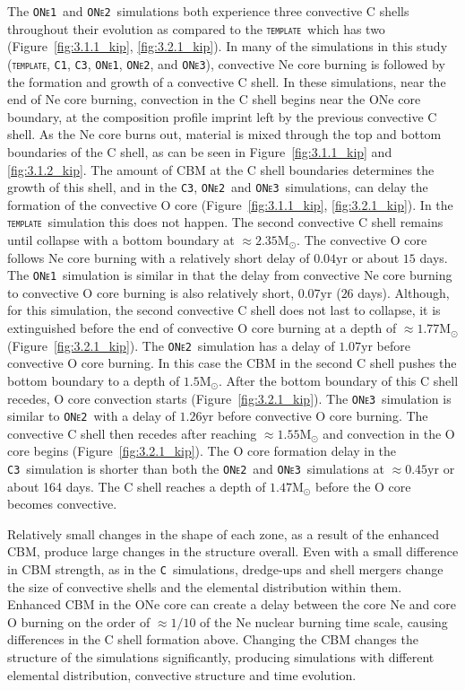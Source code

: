 \documentclass[useAMS,usenatbib]{mn2e}
\newcommand{\Msun}{\ensuremath{\mathrm{M}_\odot}}
\newcommand{\template}{\textsc{\texttt{template}}}
\newcommand{\Ca}{\textsc{\texttt{C1}}}
\newcommand{\Cc}{\textsc{\texttt{C3}}}
\newcommand{\ONea}{\textsc{\texttt{ONe1}}}
\newcommand{\ONeb}{\textsc{\texttt{ONe2}}}
\newcommand{\ONec}{\textsc{\texttt{ONe3}}}
\newcommand{\C}{\textsc{\texttt{C}}}
\begin{document}
The \ONea\ and \ONeb\ simulations both experience three convective C shells
throughout their evolution as compared to the \template\ which has two
(Figure~\ref{fig:3.1.1_kip}, \ref{fig:3.2.1_kip}). In many of the simulations
in this study (\template, \Ca, \Cc, \ONea, \ONeb, and \ONec), convective Ne core burning is followed by the formation and growth of a convective C shell. In these simulations, near the end of Ne core burning, convection in the C shell begins near the ONe core boundary, at the composition profile imprint left by the previous convective C shell. As the Ne core burns out, material is mixed through the top and bottom boundaries of the C shell, as can be seen in Figure~\ref{fig:3.1.1_kip} and \ref{fig:3.1.2_kip}. The amount of CBM at the C shell boundaries determines the growth of this shell, and in the \Cc, \ONeb\ and \ONec\ simulations, can delay the formation of the convective O core (Figure~\ref{fig:3.1.1_kip}, \ref{fig:3.2.1_kip}). In the \template\ simulation
this does not happen. The second convective C shell remains until collapse with
a bottom boundary at $\approx 2.35 \mathrm{M}_{\odot}$. The convective O core
follows Ne core burning with a relatively short delay of $0.04 \mathrm{yr}$ or
about $15$ days. The \ONea\ simulation is similar
in that the delay from convective Ne core burning to convective O core burning
is also relatively short, $0.07 \mathrm{yr}$ ($26$ days). Although, for this
simulation, the second convective C shell does not last to collapse, it is
extinguished before the end of convective O core burning at a depth of $\approx
1.77\Msun$ (Figure~\ref{fig:3.2.1_kip}). The \ONeb\ simulation
has a delay of $1.07 \mathrm{yr}$ before convective O core burning. In this case the CBM in the second C shell pushes
the bottom boundary to a depth of $1.5 \mathrm{M}_{\odot}$. After the bottom
boundary of this C shell recedes, O core convection starts
(Figure~\ref{fig:3.2.1_kip}). The \ONec\ simulation is similar to \ONeb\ with
a delay of $1.26 \mathrm{yr}$ before convective O core burning. The convective
C shell then recedes after reaching $\approx 1.55 \mathrm{M}_{\odot}$ and
convection in the O core begins (Figure~\ref{fig:3.2.1_kip}). The O core formation delay in the \Cc\ simulation is shorter than both the \ONeb\ and \ONec\ simulations at $\approx 0.45 \mathrm{yr}$ or about 164 days. The C shell reaches a depth of $1.47\Msun$ before the O core becomes convective.

Relatively small changes in the shape of each zone, as a result of the enhanced CBM, produce large changes in the structure overall. Even with a small difference in CBM strength, as in the \C\ simulations, dredge-ups and shell mergers change the size of convective shells and the elemental distribution within them. Enhanced CBM in the ONe core can create a delay between the core Ne and core O burning on the order of $\approx 1/10$ of the Ne nuclear burning time scale, causing differences in the C shell formation above. Changing the CBM changes the structure of the simulations significantly, producing simulations with different elemental distribution, convective structure and time evolution.
\end{document}
